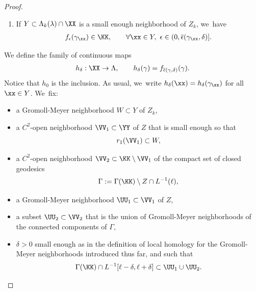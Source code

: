 \begin{proof}
\begin{enumerate}
\item\label{l:finitely_generatediii}
If $Y\subset\Lambda_k(\lambda)\cap\XX$ is a small enough neighborhood of $Z_k$, we~have
\begin{align*}
f_\epsilon(\gamma_{\xx})\in\KK,\qquad\forall\xx\in Y,\ \epsilon\in(0,\overline\epsilon(\gamma_{\xx},\delta)].
\end{align*}
\end{enumerate}
We define the family of continuous maps
\begin{align*}
h_\delta:\XX\to\Lambda,
\qquad h_\delta(\gamma)=f_{\overline\epsilon(\gamma,\delta)}(\gamma).
\end{align*}
Notice that $h_0$ is the inclusion.
As usual, we~write $h_\delta(\xx)=h_\delta(\gamma_{\xx})$ for all $\xx\in Y$. We~fix:
\begin{itemize}
\item a Gromoll-Meyer neighborhood $W\subset Y$ of $Z_k$,

\item a $C^2$-open neighborhood $\VV_1\subset\YY$ of $Z$ that is small enough so that
\[
r_1(\VV_1)\subset W,
\]

\item a $C^2$-open neighborhood $\VV_2\subset\KK\setminus\VV_1$ of the compact set of closed geodesics
\[
\Gamma:=\Gamma(\KK)\setminus Z\cap L^{-1}(\ell),
\]

\item a Gromoll-Meyer neighborhood $\UU_1\subset\VV_1$ of $Z$,

\item a subset $\UU_2\subset\VV_2$ that is the union of Gromoll-Meyer neighborhoods of the connected components of $\Gamma$,

\item $\delta>0$ small enough as in the definition of local homology for the Gromoll-Meyer neighborhoods introduced thus far, and such that
\[
\Gamma(\KK)\cap L^{-1}[\ell-\delta,\ell+\delta]\subset\UU_1\cup\UU_2.
\]
\end{itemize}


\end{proof}
